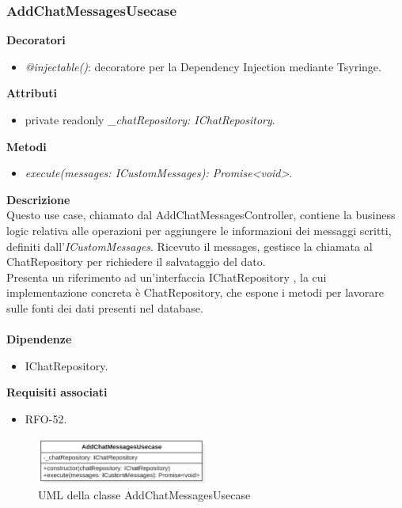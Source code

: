 \subsubsection{AddChatMessagesUsecase}
\textbf{Decoratori}
\begin{itemize}
    \item \textit{@injectable()}: decoratore per la Dependency Injection mediante Tsyringe.
\end{itemize}
\textbf{Attributi}
\begin{itemize}
    \item private readonly \textit{\_chatRepository: IChatRepository}.
\end{itemize}
\textbf{Metodi}
\begin{itemize}
    \item \textit{execute(messages: ICustomMessages): Promise<void>}.
\end{itemize}
\textbf{Descrizione}\\
Questo use case, chiamato dal AddChatMessagesController, contiene la business logic relativa alle operazioni per aggiungere le informazioni dei messaggi scritti, definiti dall'\textit{ICustomMessages}. Ricevuto il messages, gestisce la chiamata al ChatRepository per richiedere il salvataggio del dato.\\
Presenta un riferimento ad un'interfaccia IChatRepository , la cui implementazione concreta è ChatRepository, che espone i metodi per lavorare sulle fonti dei dati presenti nel database.\\ \\
\textbf{Dipendenze}
\begin{itemize}
    \item IChatRepository.
\end{itemize}
\textbf{Requisiti associati}
\begin{itemize}[itemsep=-4pt]
    \item RFO-52.
\end{itemize}

\begin{figure}[h!]
    \centering  
    \includegraphics[width=0.5\textwidth]{AddChatMessagesUsecase.png}
    \caption{UML della classe AddChatMessagesUsecase}
\end{figure}

